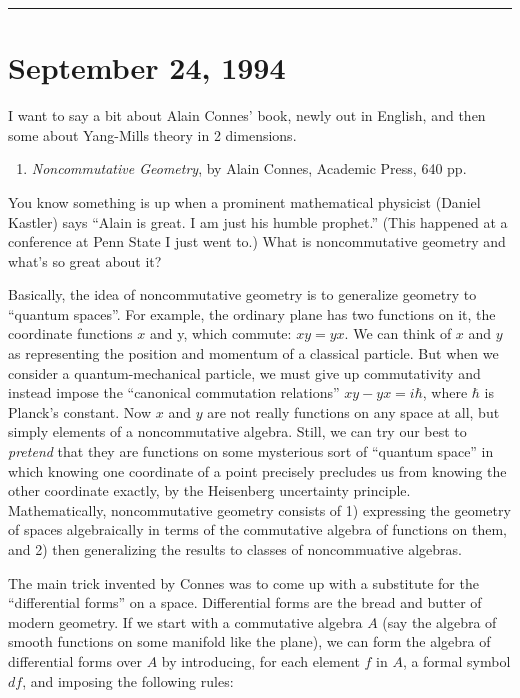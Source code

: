 \documentclass{article}
\def\tightlist{}
\begin{document}
\begin{center}\rule{0.5\linewidth}{0.5pt}\end{center}
\hypertarget{week39}{%
\section{September 24, 1994}\label{week39}}

I want to say a bit about Alain Connes' book, newly out in English, and
then some about Yang-Mills theory in 2 dimensions.

\begin{enumerate}
\def\labelenumi{\arabic{enumi})}
\tightlist
\item
  \emph{Noncommutative Geometry}, by Alain Connes, Academic Press, 640
  pp.
\end{enumerate}

You know something is up when a prominent mathematical physicist (Daniel
Kastler) says ``Alain is great. I am just his humble prophet.'' (This
happened at a conference at Penn State I just went to.) What is
noncommutative geometry and what's so great about it?

Basically, the idea of noncommutative geometry is to generalize geometry
to ``quantum spaces''. For example, the ordinary plane has two functions
on it, the coordinate functions \(x\) and y, which commute: \(xy = yx\).
We can think of \(x\) and \(y\) as representing the position and
momentum of a classical particle. But when we consider a
quantum-mechanical particle, we must give up commutativity and instead
impose the ``canonical commutation relations'' \(xy-yx = i \hbar\),
where \(\hbar\) is Planck's constant. Now \(x\) and \(y\) are not really
functions on any space at all, but simply elements of a noncommutative
algebra. Still, we can try our best to \emph{pretend} that they are
functions on some mysterious sort of ``quantum space'' in which knowing
one coordinate of a point precisely precludes us from knowing the other
coordinate exactly, by the Heisenberg uncertainty principle.
Mathematically, noncommutative geometry consists of 1) expressing the
geometry of spaces algebraically in terms of the commutative algebra of
functions on them, and 2) then generalizing the results to classes of
noncommuative algebras.

The main trick invented by Connes was to come up with a substitute for
the ``differential forms'' on a space. Differential forms are the bread
and butter of modern geometry. If we start with a commutative algebra
\(A\) (say the algebra of smooth functions on some manifold like the
plane), we can form the algebra of differential forms over \(A\) by
introducing, for each element \(f\) in \(A\), a formal symbol \(df\),
and imposing the following rules:
\end{document}
